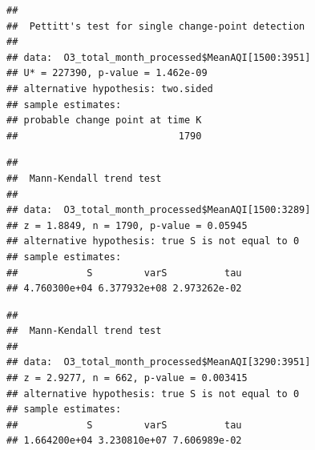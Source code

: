 \documentclass[12pt,]{article}
\newenvironment{Shaded}{\begin{snugshade}}{\end{snugshade}}
\newcommand{\KeywordTok}[1]{\textcolor[rgb]{0.13,0.29,0.53}{\textbf{#1}}}
\newcommand{\DecValTok}[1]{\textcolor[rgb]{0.00,0.00,0.81}{#1}}
\newcommand{\CommentTok}[1]{\textcolor[rgb]{0.56,0.35,0.01}{\textit{#1}}}
\newcommand{\OperatorTok}[1]{\textcolor[rgb]{0.81,0.36,0.00}{\textbf{#1}}}
\newcommand{\NormalTok}[1]{#1}
\begin{document}
\begin{Shaded}
\end{Shaded}

\begin{verbatim}
## 
##  Pettitt's test for single change-point detection
## 
## data:  O3_total_month_processed$MeanAQI[1500:3951]
## U* = 227390, p-value = 1.462e-09
## alternative hypothesis: two.sided
## sample estimates:
## probable change point at time K 
##                            1790
\end{verbatim}

\begin{Shaded}
\end{Shaded}

\begin{verbatim}
## 
##  Mann-Kendall trend test
## 
## data:  O3_total_month_processed$MeanAQI[1500:3289]
## z = 1.8849, n = 1790, p-value = 0.05945
## alternative hypothesis: true S is not equal to 0
## sample estimates:
##            S         varS          tau 
## 4.760300e+04 6.377932e+08 2.973262e-02
\end{verbatim}

\begin{Shaded}
\end{Shaded}

\begin{verbatim}
## 
##  Mann-Kendall trend test
## 
## data:  O3_total_month_processed$MeanAQI[3290:3951]
## z = 2.9277, n = 662, p-value = 0.003415
## alternative hypothesis: true S is not equal to 0
## sample estimates:
##            S         varS          tau 
## 1.664200e+04 3.230810e+07 7.606989e-02
\end{verbatim}
\end{document}
